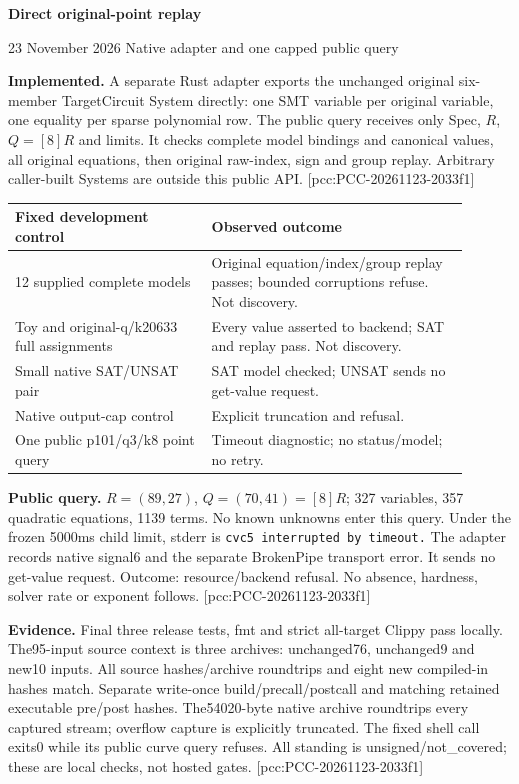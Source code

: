 \documentclass[10pt]{article}
\begin{document}
{\Large\bfseries\color{ink} Direct original-point replay}\par
{\small 23 November 2026 \quad Native adapter and one capped public query}

\textbf{Implemented.} A separate Rust adapter exports the unchanged original
six-member TargetCircuit System directly: one SMT variable per original
variable, one equality per sparse polynomial row. The public query receives
only Spec, $R$, $Q=[8]R$ and limits. It checks complete model bindings and
canonical values, all original equations, then original raw-index, sign and
group replay. Arbitrary caller-built Systems are outside this public API.
[pcc:PCC-20261123-2033f1]

\begin{center}
\begin{tabular}{p{0.39\linewidth}p{0.51\linewidth}}
\toprule Fixed development control & Observed outcome\\\midrule
12 supplied complete models & Original equation/index/group replay passes; bounded corruptions refuse. Not discovery.\\
Toy and original-q/k20633 full assignments & Every value asserted to backend; SAT and replay pass. Not discovery.\\
Small native SAT/UNSAT pair & SAT model checked; UNSAT sends no get-value request.\\
Native output-cap control & Explicit truncation and refusal.\\
One public p101/q3/k8 point query & Timeout diagnostic; no status/model; no retry.\\\bottomrule
\end{tabular}
\end{center}

\textbf{Public query.} $R=(89,27)$, $Q=(70,41)=[8]R$; 327 variables,
357 quadratic equations, 1139 terms. No known unknowns enter this query.
Under the frozen 5000ms child limit, stderr is
\texttt{cvc5 interrupted by timeout.} The adapter records native signal6 and
the separate BrokenPipe transport error. It sends no get-value request.
Outcome: resource/backend refusal. No absence, hardness, solver rate or
exponent follows. [pcc:PCC-20261123-2033f1]

\textbf{Evidence.} Final three release tests, fmt and strict all-target Clippy
pass locally. The95-input source context is three archives: unchanged76,
unchanged9 and new10 inputs. All source hashes/archive roundtrips and eight
new compiled-in hashes match. Separate write-once build/precall/postcall and
matching retained executable pre/post hashes. The54020-byte native archive
roundtrips every captured stream; overflow capture is explicitly truncated.
The fixed shell call exits0 while its public curve query refuses. All standing
is unsigned/not\_covered; these are local checks, not hosted gates.
[pcc:PCC-20261123-2033f1]
\end{document}

